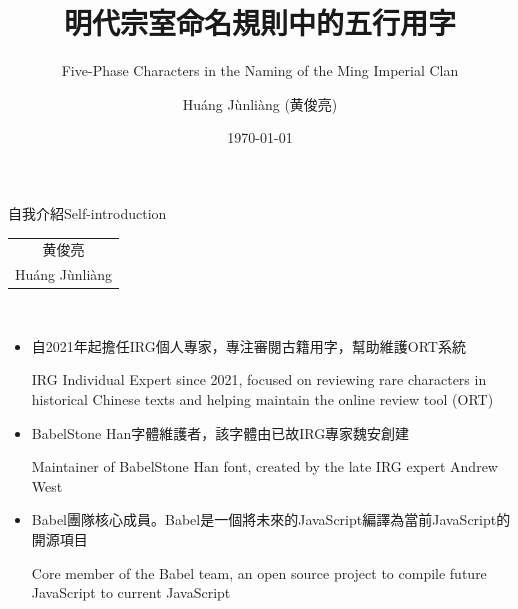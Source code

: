 \documentclass[aspectratio=169,12pt,t]{beamer}
\title{明代宗室命名規則中的五行用字}
\subtitle{Five-Phase Characters in the Naming of the Ming Imperial Clan}
\author{Huáng Jùnliàng (黄俊亮)}
\date{\today}
\makeatletter
\newcommand{\entext}[1]{{\scriptsize\color{black!60}#1}}
\newcommand{\en}[1]{\par{\parskip=0pt\scriptsize\color{black!60}#1\par}}
\newcommand{\bi}[2]{\begin{tabular}[b]{@{}c@{}}#1\\[-0.3ex]\entext{#2}\end{tabular}}
\makeatother
\begin{document}
\begin{frame}[c]
  \titlepage
\end{frame}

\begin{frame}{自我介紹}{Self-introduction}
  \bi{黄俊亮}{Huáng Jùnliàng}\\
  \begin{itemize}
    \item 自2021年起擔任IRG個人專家，專注審閱古籍用字，幫助維護ORT系統
    \en{IRG Individual Expert since 2021, focused on reviewing rare characters in historical Chinese texts and helping maintain the online review tool (ORT)}
    \item BabelStone Han字體維護者，該字體由已故IRG專家魏安創建
    \en{Maintainer of BabelStone Han font, created by the late IRG expert Andrew West}
    \item Babel團隊核心成員。Babel是一個將未來的JavaScript編譯為當前JavaScript的開源項目
    \en{Core member of the Babel team, an open source project to compile future JavaScript to current JavaScript}
  \end{itemize}
\end{frame}
\end{document}
